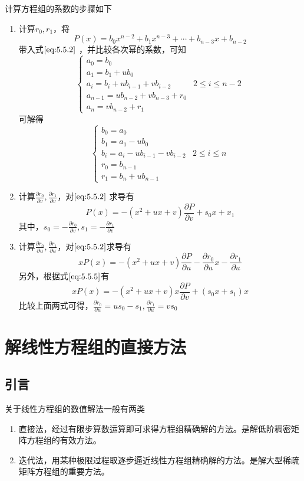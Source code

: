 \documentclass[a4paper]{article}
\begin{document}
计算方程组的系数的步骤如下
\begin{enumerate}
	\item 计算$r_0, r_1$，将
		\[
			P(x) = b_0 x^{n-2} + b_1 x^{n-3} + \cdots + b_{n-3} x + b_{n-2}
		\] 
		带入式$\ref{eq:5.5.2}$ ，并比较各次幂的系数，可知
		\[
		\begin{cases}
			a_0 = b_0 \\
			a_1 = b_1 + u b_0 \\
			a_i = b_i + u b_{i-1} + v b_{i-2} & 2 \le i \le n-2 \\
			a_{n-1} = u b_{n-2} + v b_{n-3} + r_0 \\
			a_n = v b_{n-2} + r_1
		\end{cases} 
		\] 
		可解得
		\[
		\begin{cases}
			b_0 = a_0 \\
			b_1 = a_1 - u b_0 \\
			b_i = a_i - u b_{i-1} - v b_{i-2} & 2 \le i \le n \\
			r_0 = b_{n-1} \\
			r_1 = b_n + u b_{n-1}
		\end{cases} 
		\] 
	\item 计算$\frac{\partial r_0}{\partial v} , \frac{\partial r_1}{\partial v} $，对$\ref{eq:5.5.2}$ 求导有
		\[
		P(x) = -(x^2 + u x + v) \frac{\partial P}{\partial v} + s_0 x + x_1 \tag{5.5.5} \label{eq:5.5.5} 
		\] 
		其中，$s_0 = -\frac{\partial r_0}{\partial v} ,s_1 = -\frac{\partial r_1}{\partial v}$
	\item 计算$\frac{\partial r_0}{\partial u} , \frac{\partial r_1}{\partial u} $，对$\ref{eq:5.5.2}$求导有
		\[
		x P(x) = - (x^2 + u x + v) \frac{\partial P}{\partial u} - \frac{\partial r_0}{\partial u} x - \frac{\partial r_1}{\partial u} 
		\] 
		另外，根据式$\ref{eq:5.5.5}$有
		\[
		x P(x) = - (x^2 + u x + v) x \frac{\partial P}{\partial v} + (s_0 x + s_1) x
		\] 
		比较上面两式可得，$\frac{\partial r_0}{\partial u} = us_0 - s_1, \frac{\partial r_1}{\partial u} = v s_0$

\end{enumerate}

\section{解线性方程组的直接方法}
\subsection{引言}
关于线性方程组的数值解法一般有两类
\begin{enumerate}
	\item 直接法，经过有限步算数运算即可求得方程组精确解的方法。是解低阶稠密矩阵方程组的有效方法。
	\item 迭代法，用某种极限过程取逐步逼近线性方程组精确解的方法。是解大型稀疏矩阵方程组的重要方法。
\end{enumerate}
\end{document}
